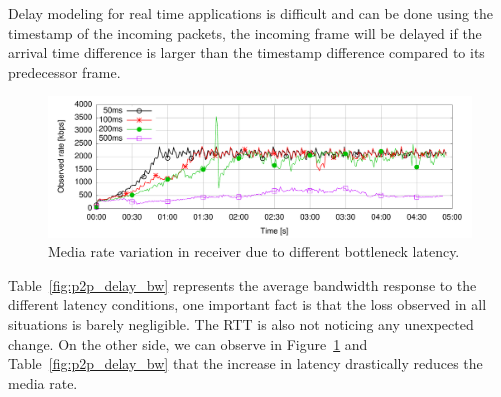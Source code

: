 Delay modeling for real time applications is difficult and can be done using the timestamp of the incoming packets, the incoming frame will be delayed if the arrival time difference is larger than the timestamp difference compared to its predecessor frame.

 \begin{figure}[h]
  \centering
    \includegraphics[width=1\textwidth]{./figures/latency-all.pdf}
      \caption[Media rate variation in receiver due to different bottleneck latency]{Media rate variation in receiver due to different bottleneck latency.}
	\label{fig:latency-all}
\end{figure}

Table~\ref{fig:p2p_delay_bw} represents the average bandwidth response to the different latency conditions, one important fact is that the loss observed in all situations is barely negligible. The RTT is also not noticing any unexpected change. On the other side, we can observe in Figure~\ref{fig:latency-all} and Table~\ref{fig:p2p_delay_bw} that the increase in latency drastically reduces the media rate.



